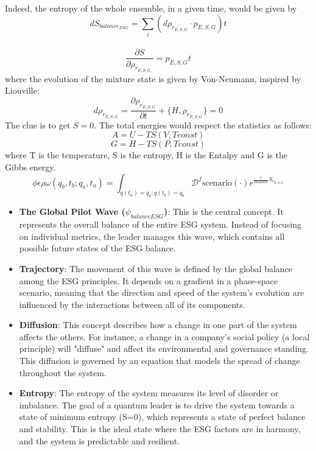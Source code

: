 \documentclass{article}
\begin{document}
Indeed, the entropy of the whole ensemble, in a given time, would be given by
\begin{equation}
    dS_{balance_{ESG}} = \sum_i (d\rho_{r_{E,S,G}} \cdot p_{E,S,G}) t
\end{equation}\\
\begin{equation}
    \frac{\partial S}{\partial \rho_{r_{E,S,G,}}} = p_{E,S,G} t
\end{equation}
where the evolution of the mixture state is given by Von-Neumann, inspired by Liouville:
\begin{equation}
    d\rho_{r_{E,S,G}} = \frac{\partial{\rho_{r_{E,S,G}}}}{\partial t} + \{H, \rho_{r_{E,S,G}}\} =0
\end{equation}
The clue is to get $S = 0$.
The total energies would respect the statistics as follows:
\begin{equation}
    A = U - TS (V,T const)
\end{equation}
\begin{equation}
    G = H - TS (P, T const)
\end{equation}
where T is the temperature, S is the entropy, H is the Entalpy and G is the Gibbs energy.
\begin{equation}
\phi\epsilon\rho\omega(q_b, t_b; q_a, t_a) = \int_{q(t_a)=q_a; q(t_b)=q_b} \mathcal{D}^f \text{scenario}(\cdot) e^{\frac{i}{\text{balance}} S_{r_{E,S,G}}}
\end{equation}
\begin{itemize}
\item \textbf{The Global Pilot Wave ($\psi_{balanceESG}$)}: This is the central concept. It represents the overall balance of the entire ESG system. Instead of focusing on individual metrics, the leader manages this wave, which contains all possible future states of the ESG balance.
\item \textbf{Trajectory}: The movement of this wave is defined by the global balance among the ESG principles. It depends on a gradient in a phase-space scenario, meaning that the direction and speed of the system's evolution are influenced by the interactions between all of its components.
\item \textbf{Diffusion}: This concept describes how a change in one part of the system affects the others. For instance, a change in a company's social policy (a local principle) will "diffuse" and affect its environmental and governance standing. This diffusion is governed by an equation that models the spread of change throughout the system.
\item \textbf{Entropy}: The entropy of the system measures its level of disorder or imbalance. The goal of a quantum leader is to drive the system towards a state of minimum entropy (S=0), which represents a state of perfect balance and stability. This is the ideal state where the ESG factors are in harmony, and the system is predictable and resilient.
\end{itemize}
\end{document}
